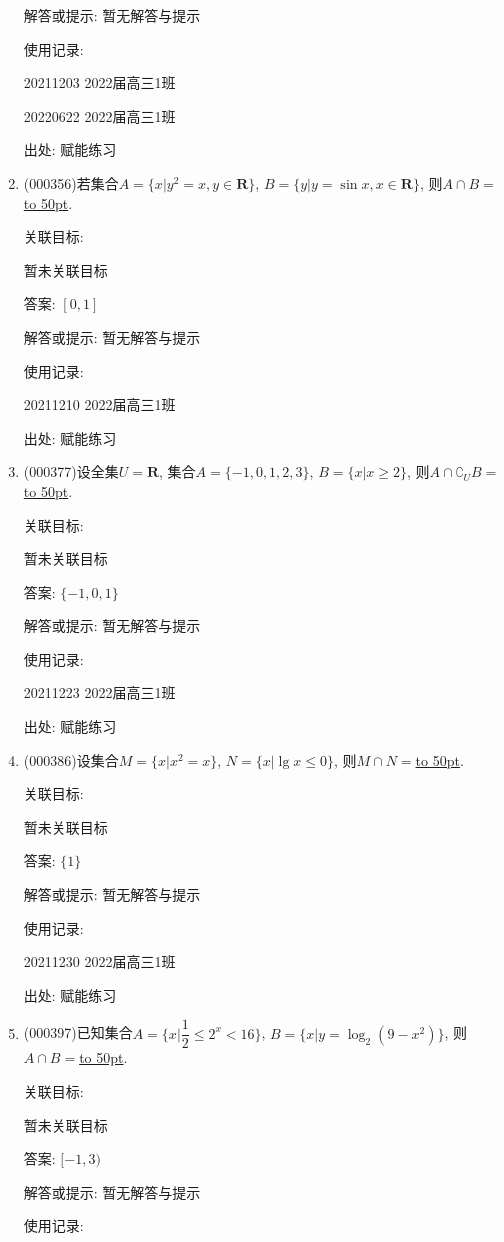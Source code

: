 \documentclass[10pt,a4paper]{article}
\newcommand{\blank}[1]{\underline{\hbox to #1pt{}}}
\begin{document}
\begin{enumerate}[1.]
解答或提示: 暂无解答与提示

使用记录:

20211203	2022届高三1班	

20220622	2022届高三1班  	


出处: 赋能练习
\item { (000356)}若集合$A=\{x|y^2=x,y\in \mathbf{R}\}$, $B=\{y|y=\sin x,x\in \mathbf{R}\}$, 则$A\cap B=$\blank{50}.


关联目标:

暂未关联目标

答案: $[0,1]$

解答或提示: 暂无解答与提示

使用记录:

20211210	2022届高三1班	


出处: 赋能练习
\item { (000377)}设全集$U=\mathbf{R}$, 集合$A=\{-1,0,1,2,3\}$, $B=\{x|x\ge 2\}$, 则$A\cap {\complement_U}B=$\blank{50}.


关联目标:

暂未关联目标

答案: $\{-1,0,1\}$

解答或提示: 暂无解答与提示

使用记录:

20211223	2022届高三1班	


出处: 赋能练习
\item { (000386)}设集合$M=\{x|x^2=x\}$, $N=\{x|\lg x\le 0\}$, 则$M\cap N=$\blank{50}.


关联目标:

暂未关联目标

答案: $\{1\}$

解答或提示: 暂无解答与提示

使用记录:

20211230	2022届高三1班	


出处: 赋能练习
\item { (000397)}已知集合$A=\{x|\dfrac12\le {2^x}<16\}$, $B=\{x|y=\log _2(9-x^2)\}$, 则$A\cap B=$\blank{50}.


关联目标:

暂未关联目标

答案: $[-1,3)$

解答或提示: 暂无解答与提示

使用记录:


\end{enumerate}
\end{document}

